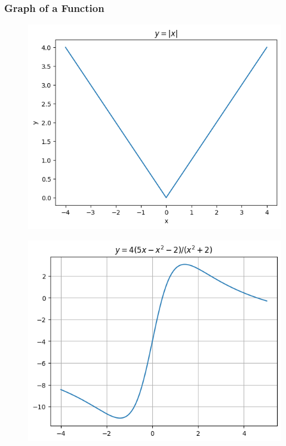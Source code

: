 \documentclass{beamer}
\begin{document}
\begin{frame}
  \frametitle{Graph of a Function}
  \begin{figure}[h]    
    \centering
    \includegraphics[scale=0.3]{graph.png}
\end{figure}

\begin{figure}[h]    
  \centering
  \includegraphics[scale=0.3]{graph2.png}
\end{figure}
\end{frame}
\end{document}
